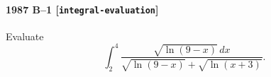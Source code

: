 \paragraph{1987 B--1 \textnormal{[\texttt{integral-evaluation}]}}
Evaluate
\[
\int_2^4 \frac{\sqrt{\ln(9-x)}\,dx}{\sqrt{\ln(9-x)}+\sqrt{\ln(x+3)}}.
\]
